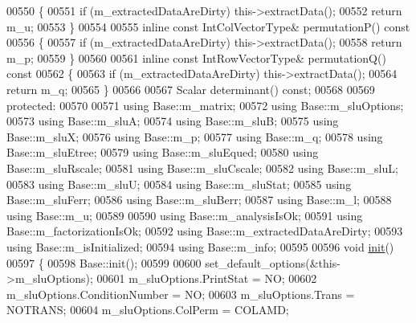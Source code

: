 \begin{DoxyCode}
00550 \textcolor{keyword}{    }\{
00551       \textcolor{keywordflow}{if} (m\_extractedDataAreDirty) this->extractData();
00552       \textcolor{keywordflow}{return} m\_u;
00553     \}
00554 
00555     \textcolor{keyword}{inline} \textcolor{keyword}{const} IntColVectorType& permutationP()\textcolor{keyword}{ const}
00556 \textcolor{keyword}{    }\{
00557       \textcolor{keywordflow}{if} (m\_extractedDataAreDirty) this->extractData();
00558       \textcolor{keywordflow}{return} m\_p;
00559     \}
00560 
00561     \textcolor{keyword}{inline} \textcolor{keyword}{const} IntRowVectorType& permutationQ()\textcolor{keyword}{ const}
00562 \textcolor{keyword}{    }\{
00563       \textcolor{keywordflow}{if} (m\_extractedDataAreDirty) this->extractData();
00564       \textcolor{keywordflow}{return} m\_q;
00565     \}
00566     
00567     Scalar determinant() \textcolor{keyword}{const};
00568     
00569   \textcolor{keyword}{protected}:
00570     
00571     \textcolor{keyword}{using} Base::m\_matrix;
00572     \textcolor{keyword}{using} Base::m\_sluOptions;
00573     \textcolor{keyword}{using} Base::m\_sluA;
00574     \textcolor{keyword}{using} Base::m\_sluB;
00575     \textcolor{keyword}{using} Base::m\_sluX;
00576     \textcolor{keyword}{using} Base::m\_p;
00577     \textcolor{keyword}{using} Base::m\_q;
00578     \textcolor{keyword}{using} Base::m\_sluEtree;
00579     \textcolor{keyword}{using} Base::m\_sluEqued;
00580     \textcolor{keyword}{using} Base::m\_sluRscale;
00581     \textcolor{keyword}{using} Base::m\_sluCscale;
00582     \textcolor{keyword}{using} Base::m\_sluL;
00583     \textcolor{keyword}{using} Base::m\_sluU;
00584     \textcolor{keyword}{using} Base::m\_sluStat;
00585     \textcolor{keyword}{using} Base::m\_sluFerr;
00586     \textcolor{keyword}{using} Base::m\_sluBerr;
00587     \textcolor{keyword}{using} Base::m\_l;
00588     \textcolor{keyword}{using} Base::m\_u;
00589     
00590     \textcolor{keyword}{using} Base::m\_analysisIsOk;
00591     \textcolor{keyword}{using} Base::m\_factorizationIsOk;
00592     \textcolor{keyword}{using} Base::m\_extractedDataAreDirty;
00593     \textcolor{keyword}{using} Base::m\_isInitialized;
00594     \textcolor{keyword}{using} Base::m\_info;
00595     
00596     \textcolor{keywordtype}{void} \hyperlink{structinit}{init}()
00597     \{
00598       Base::init();
00599       
00600       set\_default\_options(&this->m\_sluOptions);
00601       m\_sluOptions.PrintStat        = NO;
00602       m\_sluOptions.ConditionNumber  = NO;
00603       m\_sluOptions.Trans            = NOTRANS;
00604       m\_sluOptions.ColPerm          = COLAMD;

\end{DoxyCode}
